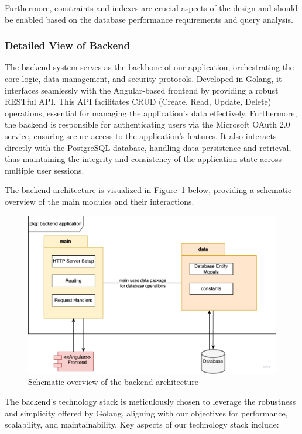 Furthermore, constraints and indexes are crucial aspects of the design and should be enabled based on the database performance requirements and query analysis.

\subsubsection{Detailed View of Backend}
The backend system serves as the backbone of our application, orchestrating the core logic, data management, and security protocols.
Developed in Golang, it interfaces seamlessly with the Angular-based frontend by providing a robust RESTful API. This API facilitates CRUD (Create, Read, Update, Delete) operations, essential for managing the application's data effectively.
Furthermore, the backend is responsible for authenticating users via the Microsoft OAuth 2.0 service, ensuring secure access to the application's features.
It also interacts directly with the PostgreSQL database, handling data persistence and retrieval, thus maintaining the integrity and consistency of the application state across multiple user sessions.

The backend architecture is visualized in Figure~\ref{fig:backend_architecture} below, providing a schematic overview of the main modules and their interactions.

\begin{figure}[ht]
    \centering
    \includegraphics[width=\textwidth]{images/backend/backend_pkg_level_2}
    \caption{Schematic overview of the backend architecture}
    \label{fig:backend_architecture}
\end{figure}

The backend's technology stack is meticulously chosen to leverage the robustness and simplicity offered by Golang, aligning with our objectives for performance, scalability, and maintainability. Key aspects of our technology stack include:

